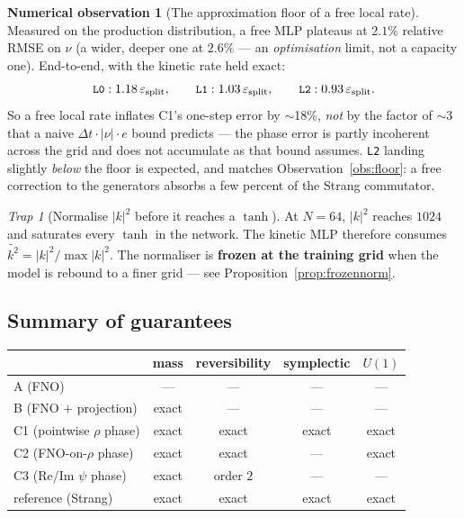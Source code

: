 \documentclass[11pt,a4paper]{article}
\theoremstyle{plain}
\theoremstyle{definition}
\newtheorem{observation}[theorem]{Numerical observation}
\theoremstyle{remark}
\newtheorem{trap}[theorem]{Trap}
\newcommand{\dt}{\Delta t}
\newcommand{\epssplit}{\varepsilon_{\mathrm{split}}}
\newcommand{\code}[1]{\texttt{\small #1}}
\begin{document}
\begin{observation}[The approximation floor of a free local rate]
\label{obs:ladder}
Measured on the production distribution, a free MLP plateaus at $2.1\%$ relative RMSE on
$\nu$ (a wider, deeper one at $2.6\%$ --- an \emph{optimisation} limit, not a capacity
one). End-to-end, with the kinetic rate held exact:
\[
\code{L0}: 1.18\,\epssplit,\qquad
\code{L1}: 1.03\,\epssplit,\qquad
\code{L2}: 0.93\,\epssplit .
\]
So a free local rate inflates C1's one-step error by $\sim$18\%, \emph{not} by the factor
of $\sim$3 that a naive $\dt\cdot|\nu|\cdot e$ bound predicts --- the phase error is partly
incoherent across the grid and does not accumulate as that bound assumes. \code{L2}
landing slightly \emph{below} the floor is expected, and matches
Observation~\ref{obs:floor}: a free correction to the generators absorbs a few percent of
the Strang commutator.
\end{observation}

\begin{trap}[Normalise $|k|^2$ before it reaches a $\tanh$]
At $N=64$, $|k|^2$ reaches $1024$ and saturates every $\tanh$ in the network. The
kinetic MLP therefore consumes $\widetilde{k^2} = |k|^2/\max|k|^2$. The normaliser is
\textbf{frozen at the training grid} when the model is rebound to a finer grid --- see
Proposition~\ref{prop:frozennorm}.
\end{trap}

\subsection{Summary of guarantees}

\begin{center}
\begin{tabular}{@{}lcccc@{}}
\toprule
& \textbf{mass} & \textbf{reversibility} & \textbf{symplectic} & \textbf{$U(1)$}\\
\midrule
A \; (FNO) & --- & --- & --- & ---\\
B \; (FNO $+$ projection) & exact & --- & --- & ---\\
C1 (pointwise $\rho$ phase) & exact & exact & exact & exact\\
C2 (FNO-on-$\rho$ phase) & exact & exact & --- & exact\\
C3 (Re/Im $\psi$ phase) & exact & order $2$ & --- & ---\\
\midrule
reference (Strang) & exact & exact & exact & exact\\
\bottomrule
\end{tabular}
\end{center}
\end{document}
